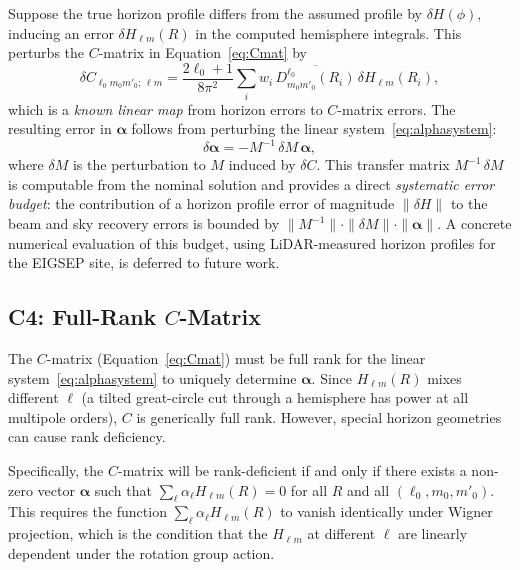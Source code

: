 \documentclass{aastex631}
\newcommand{\Hlm}{H_{\ell m}}
\theoremstyle{plain}
\theoremstyle{remark}
\begin{document}
Suppose the true horizon profile differs from the assumed profile by
$\delta H(\phi)$, inducing an error $\delta \Hlm(R)$ in the computed
hemisphere integrals.
This perturbs the $C$-matrix in Equation~\ref{eq:Cmat} by
\begin{equation}
  \delta C_{\ell_0 m_0 m'_0;\,\ell m}
  = \frac{2\ell_0+1}{8\pi^2}
  \sum_i w_i\,
  \overline{D^{\ell_0}_{m_0 m'_0}(R_i)}\,\delta\Hlm(R_i),
\end{equation}
which is a \emph{known linear map} from horizon errors to $C$-matrix
errors.
The resulting error in $\boldsymbol{\alpha}$ follows from perturbing
the linear system~\ref{eq:alphasystem}:
\begin{equation} \label{eq:alphaerror}
  \delta\boldsymbol{\alpha} = -M^{-1}\,\delta M\,\boldsymbol{\alpha},
\end{equation}
where $\delta M$ is the perturbation to $M$ induced by $\delta C$.
This transfer matrix $M^{-1}\,\delta M$ is computable from the
nominal solution and provides a direct \emph{systematic error budget}:
the contribution of a horizon profile error of magnitude
$\|\delta H\|$ to the beam and sky recovery errors is bounded by
$\|M^{-1}\| \cdot \|\delta M\| \cdot \|\boldsymbol{\alpha}\|$.
A concrete numerical evaluation of this budget, using LiDAR-measured
horizon profiles for the EIGSEP site, is deferred to future work.

\subsection{C4: Full-Rank $C$-Matrix}
\label{sec:rank}

The $C$-matrix (Equation~\ref{eq:Cmat}) must be full rank for the
linear system~\ref{eq:alphasystem} to uniquely determine
$\boldsymbol{\alpha}$.
Since $\Hlm(R)$ mixes different $\ell$ (a tilted great-circle cut
through a hemisphere has power at all multipole orders), $C$ is
generically full rank.
However, special horizon geometries can cause rank deficiency.

Specifically, the $C$-matrix will be rank-deficient if and only if
there exists a non-zero vector $\boldsymbol{\alpha}$ such that
$\sum_\ell \alpha_\ell \Hlm(R) = 0$ for all $R$ and all
$(\ell_0, m_0, m'_0)$.
This requires the function $\sum_\ell \alpha_\ell \Hlm(R)$ to vanish
identically under Wigner projection, which is the condition that
the $\Hlm$ at different $\ell$ are linearly dependent under the
rotation group action.
\end{document}
